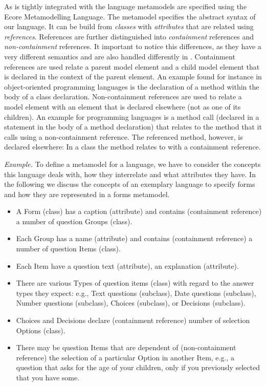 	As \EMFText is tightly integrated with the \EMF language metamodels are
	specified using the Ecore Metamodelling Language. The metamodel specifies the abstract
	syntax of our language. It can be build from \emph{classes} with
	\emph{attributes} that are related using \emph{references}. References are
	further distinguished into \emph{containment} references and
	\emph{non-containment} references. It important to notice this differences, as
	they have a very different semantics and are also handled differently in
	\EMFText. Containment references are used relate a parent model element and a
	child model element that is declared in the context of the parent element. An
	example found for instance in object-oriented programming languages is the
	declaration of a method within the body of a class declaration. Non-containment
	references are used to relate a model element with an element that is declared
	elsewhere (not as one of its children). An example for programming languages is
	a method call (declared in a statement in the body of a method declaration) that
	relates to the method that it calls using a non-containment reference. The
	referenced method, however, is declared elsewhere: In a class the method
	relates to with a containment reference. 

		\emph{Example.} 
		To define a metamodel for a language, we have to consider the
		concepts this language deals with, how they interrelate and what attributes they
		have. In the following we discuss the concepts of an exemplary language to
		specify forms and how they are represented in a forms metamodel.
		
		\begin{itemize} 
		  \item A Form (class) has a caption (attribute) and contains (containment
		  reference) a number of question Groups (class).
		  \item Each Group has a name (attribute) and contains (containment reference)
		  a number of question Items (class).
		  \item Each Item have a question text (attribute), an explanation
		  (attribute).
		  \item There are various Types of question items (class)  with
		  regard to the answer types they expect: e.g., Text questions
		  (subclass), Date questions  (subclass), Number questions  (subclass),
		  Choices (subclass), or Decisions (subclass).
		  \item Choices and Decisions declare (containment reference) number of
		  selection Options (class).
		  \item There may be question Items
		  that are dependent of (non-containment reference) the selection of a 
		  particular Option in another Item, 
		  e.g., a question that asks for the age of your children, only if you
		  previously selected that you have some.
		\end{itemize}

